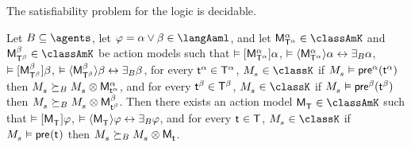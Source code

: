 \begin{corollary}
The satisfiability problem for the logic \logicAamlK{} is decidable.
\end{corollary}

\begin{lemma}\label{aaml-k-choice}
Let $\agentsB \subseteq \agents$, 
let $\phi = \alpha \lor \beta \in \langAaml$, and 
let $\aPModel[\alpha]{\aStatesT[\alpha]} \in \classAmK$ and $\aPModel[\beta]{\aStatesT[\beta]} \in \classAmK$ be action models such that 
$\entails \actionA{\aPModel[\alpha]{\aStatesT[\alpha]}} \alpha$, 
$\entails \actionE{\aPModel[\alpha]{\aStatesT[\alpha]}} \alpha \iff \someactsBs \alpha$, 
$\entails \actionA{\aPModel[\beta]{\aStatesT[\beta]}} \beta$,
$\entails \actionE{\aPModel[\beta]{\aStatesT[\beta]}} \beta \iff \someactsBs \beta$,
for every $\aStateT[\alpha] \in \aStatesT[\alpha]$, $\kPModel{\kStateS} \in \classK$ if $\kPModel{\kStateS} \entails \aPrecondition[\alpha](\aStateT[\alpha])$ then $\kPModel{\kStateS} \simulatesBs \kPModel{\kStateS} \exec \aPModel[\alpha]{\aStateT[\alpha]}$, and
for every $\aStateT[\beta] \in \aStatesT[\beta]$, $\kPModel{\kStateS} \in \classK$ if $\kPModel{\kStateS} \entails \aPrecondition[\beta](\aStateT[\beta])$ then $\kPModel{\kStateS} \simulatesBs \kPModel{\kStateS} \exec \aPModel[\beta]{\aStateT[\beta]}$.
Then there exists an action model $\aPModel{\aStatesT} \in \classAmK$ such that 
$\entails \actionA{\aPModel{\aStatesT}} \phi$,
$\entails \actionE{\aPModel{\aStatesT}} \phi \iff \someactsBs \phi$, and
for every $\aStateT \in \aStatesT$, $\kPModel{\kStateS} \in \classK$ if $\kPModel{\kStateS} \entails \aPrecondition(\aStateT)$ then $\kPModel{\kStateS} \simulatesBs \kPModel{\kStateS} \exec \aPModel{\aStateT}$.
\end{lemma}

